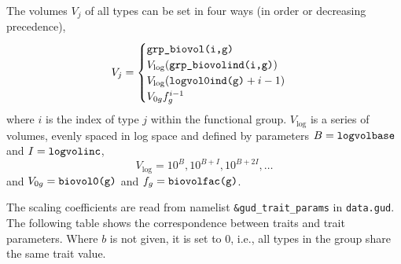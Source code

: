 \documentclass[11pt,letterpaper,english]{article}
\begin{document}
The volumes $V_j$ of all types can be set in four ways (in order or
decreasing precedence),
\[
  V_j = \begin{cases}
    \verb|grp_biovol(i,g)| &  \\
    V_{\log}(\verb|grp_biovolind(i,g)|) \\
    V_{\log}(\verb|logvol0ind(g)|+i-1) \\
    V_{0 g} f_g^{i-1}
  \end{cases}
\]
where $i$ is the index of type $j$ within the functional group.
$V_{\log}$ is a series of volumes, evenly spaced in log space and defined by
parameters $B=\verb|logvolbase|$ and $I=\verb|logvolinc|$,
\[
  V_{\log} = 10^B, 10^{B+I}, 10^{B+2I}, \dots
\]
and $V_{0 g}=\verb|biovol0(g)|$ and $f_g=\verb|biovolfac(g)|$.

The scaling coefficients are read from namelist \verb|&gud_trait_params| in
\verb|data.gud|.  The following table
shows the correspondence between traits and trait parameters.  Where $b$ is
not given, it is set to 0, i.e., all types in the group share the same trait
value.
\end{document}
